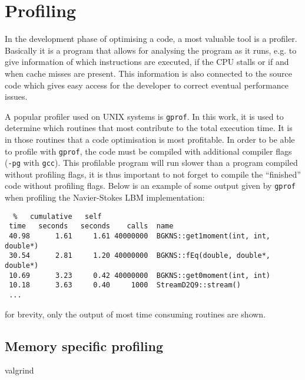 \section{Profiling}
In the development phase of optimising a code, a most valuable tool is
a profiler. Basically it is a program that allows for analysing the
program as it runs, e.g. to give information of which instructions are
executed, if the CPU stalls or if and when cache misses are
present. This information is also connected to the source code which
gives easy access for the developer to correct eventual performance
issues.

A popular profiler used on UNIX systems is \texttt{gprof}. In this
work, it is used to determine which routines that most contribute to
the total execution time. It is in those routines that a code
optimisation is most profitable. In order to be able to profile with
\texttt{gprof}, the code must be compiled with additional compiler
flags (\texttt{-pg} with \texttt{gcc}). This profilable program will
run slower than a program compiled without profiling flags, it is thus
important to not forget to compile the ``finished'' code without
profiling flags. Below is an example of some output given by
\texttt{gprof} when profiling the Navier-Stokes LBM implementation:

\begin{verbatim}
  %   cumulative   self                         
 time   seconds   seconds    calls  name    
 40.98      1.61     1.61 40000000  BGKNS::get1moment(int, int, double*)
 30.54      2.81     1.20 40000000  BGKNS::fEq(double, double*, double*)
 10.69      3.23     0.42 40000000  BGKNS::get0moment(int, int)
 10.18      3.63     0.40     1000  StreamD2Q9::stream()
 ...
\end{verbatim}
for brevity, only the output of most time consuming routines are
shown. 

\subsection{Memory specific profiling}

valgrind
